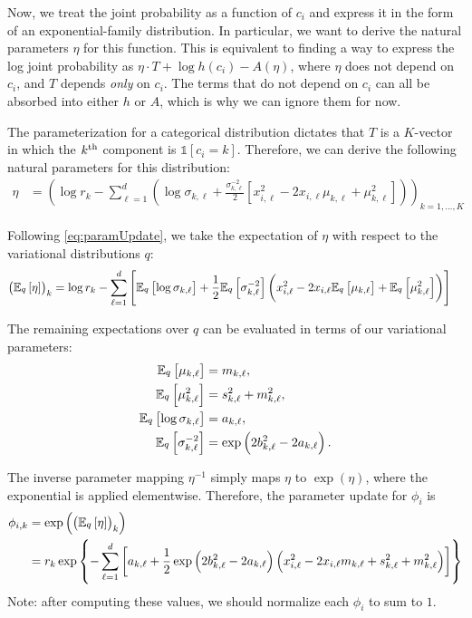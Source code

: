 \documentclass[11pt]{article}
\begin{document}
Now, we treat the joint probability as a function of $c_i$ and express it in the form of an exponential-family distribution.
In particular, we want to derive the natural parameters $\eta$ for this function.
This is equivalent to finding a way to express the log joint probability as $\eta \cdot T + \log h(c_i) - A(\eta)$, where $\eta$ does not depend on $c_i$, and $T$ depends \emph{only} on $c_i$.
The terms that do not depend on $c_i$ can all be absorbed into either $h$ or $A$, which is why we can ignore them for now.

The parameterization for a categorical distribution dictates that $T$ is a $K$-vector in which the $k^{\mathrm{th}}$ component is $\mathds{1}[c_i = k]$.
Therefore, we can derive the following natural parameters for this distribution:
\begin{align}
\eta &= \left(
    \log r_k - \sum_{\ell=1}^d \left(
    \log \sigma_{k, \ell} + \frac{\sigma_{k, \ell}^{-2}}{2}
        \left[
            x_{i,\ell}^2 - 2 x_{i,\ell} \mu_{k,\ell} + \mu_{k,\ell}^2
        \right]
    \right)
\right)_{k = 1, \ldots, K}
\end{align}

Following \eqref{eq:paramUpdate}, we take the expectation of $\eta$ with respect to the variational distributions $q$:
\begin{align}
\left( \mathbb{E}_{\substack{q}}\left[ \eta \right] \right)_k
&=
    \log r_k - \sum_{\ell=1}^d \left[
    \mathbb{E}_{\substack{q}}\left[ \log \sigma_{k, \ell} \right] + \frac{1}{2} \mathbb{E}_{\substack{q}}\left[ \sigma_{k, \ell}^{-2} \right]
        \left(
            x_{i,\ell}^2 - 2 x_{i,\ell} \mathbb{E}_{\substack{q}}\left[ \mu_{k,\ell} \right] + \mathbb{E}_{\substack{q}}\left[ \mu_{k,\ell}^2 \right]
        \right)
    \right]
\end{align}

The remaining expectations over $q$ can be evaluated in terms of our variational parameters:
\begin{align}
\mathbb{E}_{\substack{q}}\left[ \mu_{k,\ell} \right]
&= m_{k,\ell}, \\
\mathbb{E}_{\substack{q}}\left[ \mu_{k,\ell}^2 \right]
&= s_{k,\ell}^2 + m_{k,\ell}^2, \\
\mathbb{E}_{\substack{q}}\left[ \log\sigma_{k,\ell} \right]
&= a_{k,\ell}, \\
\mathbb{E}_{\substack{q}}\left[ \sigma_{k,\ell}^{-2} \right]
&= \exp\left( 2b_{k,\ell}^2 - 2a_{k,\ell} \right).
\end{align}

The inverse parameter mapping $\eta^{-1}$ simply maps $\eta$ to $\exp(\eta)$, where the exponential is applied elementwise.
Therefore, the parameter update for $\phi_i$ is
\begin{align}
\phi_{i,k}
&= \exp\left( \left( \mathbb{E}_{\substack{q}}\left[ \eta \right] \right)_k \right) \\
&= r_k \exp \left\{
    - \sum_{\ell=1}^d \left[
        a_{k, \ell} + \frac{1}{2}\exp\left(2b_{k,\ell}^2 - 2a_{k,\ell}\right)
            \left(
                x_{i,\ell}^2 - 2 x_{i,\ell} m_{k,\ell} + s_{k,\ell}^2 + m_{k,\ell}^2
            \right)
      \right]
    \right\}
\end{align}
Note: after computing these values, we should normalize each $\phi_i$ to sum to $1$.
\end{document}
